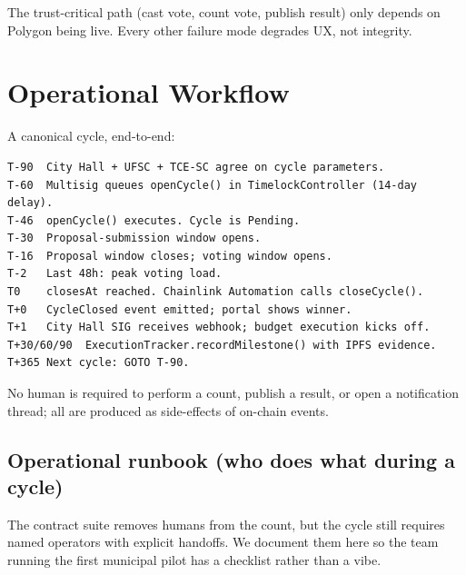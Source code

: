 \documentclass[12pt]{article}
\begin{document}
The trust-critical path (cast vote, count vote, publish result) only depends
on Polygon being live. Every other failure mode degrades UX, not integrity.

\section{Operational Workflow}
\label{sec:workflow}

A canonical cycle, end-to-end:

\begin{lstlisting}
T-90  City Hall + UFSC + TCE-SC agree on cycle parameters.
T-60  Multisig queues openCycle() in TimelockController (14-day delay).
T-46  openCycle() executes. Cycle is Pending.
T-30  Proposal-submission window opens.
T-16  Proposal window closes; voting window opens.
T-2   Last 48h: peak voting load.
T0    closesAt reached. Chainlink Automation calls closeCycle().
T+0   CycleClosed event emitted; portal shows winner.
T+1   City Hall SIG receives webhook; budget execution kicks off.
T+30/60/90  ExecutionTracker.recordMilestone() with IPFS evidence.
T+365 Next cycle: GOTO T-90.
\end{lstlisting}

No human is required to perform a count, publish a result, or open a
notification thread; all are produced as side-effects of on-chain events.

\subsection{Operational runbook (who does what during a cycle)}

The contract suite removes humans from the count, but the cycle still
requires named operators with explicit handoffs. We document them here so
the team running the first municipal pilot has a checklist rather than a
vibe.
\end{document}
